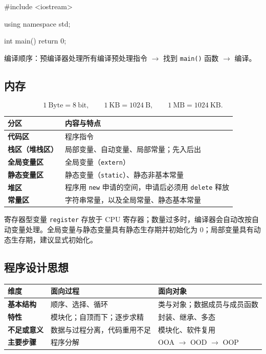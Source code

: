 \documentclass[UTF8,fontset=fandol,zihao=5]{ctexart}
\newcommand{\code}[1]{\texttt{#1}}
\begin{document}
\begin{cppcode}[程序基本结构]
#include <iostream>

using namespace std;

int main() {
    return 0;
}
\end{cppcode}

编译顺序：预编译器处理所有编译预处理指令 $\to$ 找到 \code{main()} 函数 $\to$ 编译。

\subsection{内存}

\[
1\ \text{Byte}=8\ \text{bit},\qquad
1\ \text{KB}=1024\ \text{B},\qquad
1\ \text{MB}=1024\ \text{KB}.
\]

\begin{center}
\begin{tabularx}{0.94\textwidth}{>{\bfseries}p{2.8cm}X}
\toprule
分区 & 内容与特点 \\
\midrule
代码区 & 程序指令 \\
栈区（堆栈区） & 局部变量、自动变量、局部常量；先入后出 \\
全局变量区 & 全局变量（\code{extern}） \\
静态变量区 & 静态变量（\code{static}）、静态非基本常量 \\
堆区 & 程序用 \code{new} 申请的空间，申请后必须用 \code{delete} 释放 \\
常量区 & 字符串常量，以及全局常量、静态基本常量 \\
\bottomrule
\end{tabularx}
\end{center}

寄存器型变量 \code{register} 存放于 CPU 寄存器；数量过多时，编译器会自动改按自动变量处理。全局变量与静态变量具有静态生存期并初始化为 $0$；局部变量具有动态生存期，建议显式初始化。

\subsection{程序设计思想}

\begin{center}
\begin{tabularx}{0.94\textwidth}{>{\bfseries}p{2.7cm}X X}
\toprule
维度 & 面向过程 & 面向对象 \\
\midrule
基本结构 & 顺序、选择、循环 & 类与对象；数据成员与成员函数 \\
特性 & 模块化；自顶而下；逐步求精 & 封装、继承、多态 \\
不足或意义 & 数据与过程分离，代码重用不足 & 模块化、软件复用 \\
主要步骤 & 程序分解 & OOA $\to$ OOD $\to$ OOP \\
\bottomrule
\end{tabularx}
\end{center}
\end{document}
